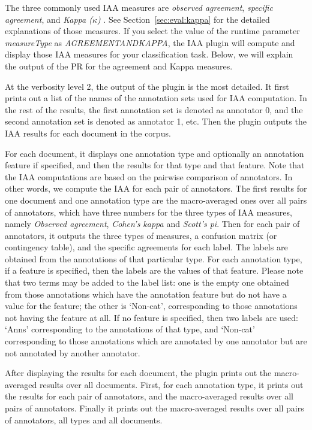 The three commonly used IAA measures are {\em observed agreement}, {\em specific
agreement}, and {\em Kappa ($\kappa$)} \cite{Hripcsak02}. See
Section~\ref{sec:eval:kappa} for the detailed explanations of those measures. If
you select the value of the runtime parameter {\em measureType} as {\em
AGREEMENTANDKAPPA}, the IAA plugin will compute and display those IAA measures
for your classification task. Below, we will explain the output of the
PR for the agreement and Kappa measures.

At the verbosity level 2, the output of the plugin is the most detailed. It first
prints out a list of the names of the annotation sets used for IAA computation.
In the rest of the results, the first annotation set is denoted as annotator
0, and the second annotation set is denoted as annotator 1, etc.  Then the plugin
outputs the IAA results for each document in the corpus.

For each document, it displays one annotation type and optionally an annotation
feature if specified, and then the results for that type and that feature. Note
that the IAA computations are based on the pairwise comparison of annotators. In
other words, we compute the IAA for each pair of annotators. The first results
for one document and one annotation type are the macro-averaged ones over all
pairs of annotators, which have three numbers for the three types of IAA
measures, namely {\em Observed agreement}, {\em Cohen's kappa} and {\em Scott's
pi}. Then for each pair of annotators, it outputs the three types of measures, a
confusion matrix (or contingency table), and the specific agreements for each
label.  The labels are obtained from the annotations of that particular type. For
each annotation type, if a feature is specified, then the labels are the values
of that feature. Please note that two terms may be added to the label list: one
is the empty one obtained from those annotations which have the annotation
feature but do not have a value for the feature; the other is `Non-cat',
corresponding to those annotations not having the feature at all. If no feature
is specified, then two labels are used: `Anns' corresponding to the annotations
of that type, and `Non-cat' corresponding to those annotations which are
annotated by one annotator but are not annotated by another annotator.

After displaying the results for each document, the plugin prints out the
macro-averaged results over all documents. First, for each annotation type, it
prints out the results for each pair of annotators, and the macro-averaged
results over all pairs of annotators. Finally it prints out the macro-averaged
results over all pairs of annotators, all types and all documents.

